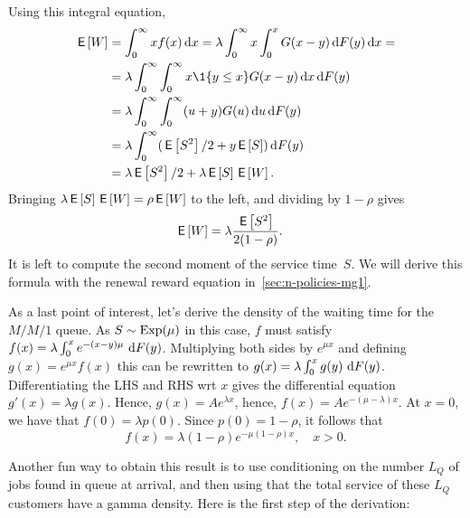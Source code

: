 \documentclass[stochastic-or.tex]{subfiles}
\begin{document}
Using this integral equation,
\begin{align*}
  \E W
  &=    \int_0^{\infty} x f(x) \d x
  = \lambda \int_0^{\infty} x \int_0^{x} G(x-y) \d F(y) \d x= \\
  &= \lambda \int_0^{\infty} \int_0^{\infty} x \1{y \leq x} G(x-y) \d x \d F(y) \\
  &= \lambda \int_0^{\infty} \int_0^{\infty} (u+y) G(u) \d u \d F(y) \\
  &= \lambda \int_0^{\infty} (\E{S^2}/2 + y \E S) \d F(y) \\
  &= \lambda \E{S^2}/2 + \lambda \E S \E W. %
\end{align*}
Bringing $\lambda \,\mathsf{E}\left[S\right] \,\mathsf{E}\left[W\right] = \rho \,\mathsf{E}\left[W\right]$ to the left, and dividing by $1-\rho$ gives
\begin{align*}
  \,\mathsf{E}\left[W\right]  &= \lambda \frac{\,\mathsf{E}\left[S^2\right]}{2(1-\rho)}.
\end{align*}
It is left to compute the second moment of the service time~$S$. We will derive this formula with the renewal reward equation in~\cref{sec:n-policies-mg1}.

As a last point of interest, let's derive the density of the waiting time for the $M/M/1$ queue.
As $S\sim \mathrm{Exp}(\mu)$ in this case, $f$ must satisfy $f(x) =  \lambda \int_0^x  e^{-(x-y)\mu} \,\,\textrm{d}F(y)$.
Multiplying both sides by $e^{\mu x}$ and defining $g(x) = e^{\mu x} f(x)$ this can be rewritten to
$g(x) = \lambda \int_0^x g(y) \,\,\textrm{d}F(y)$.
Differentiating the LHS and RHS wrt $x$ gives the differential equation $g'(x) = \lambda g(x)$. Hence, $g(x) = A e^{\lambda x}$, hence,
$f(x) = A e^{-(\mu-\lambda)x}$.  At $x=0$, we have that $f(0) = \lambda p(0)$.
Since $p(0)=1-\rho$, it follows that
\begin{equation}\label{eq:l22}
f(x) = \lambda(1-\rho) e^{- \mu(1-\rho)x}, \quad x > 0.
\end{equation}

Another fun way to obtain this result is to use conditioning on the number $L_Q$ of jobs found in queue at arrival, and then using that the total service of these $L_Q$ customers have a gamma density. Here is the first step of the derivation:
\end{document}
